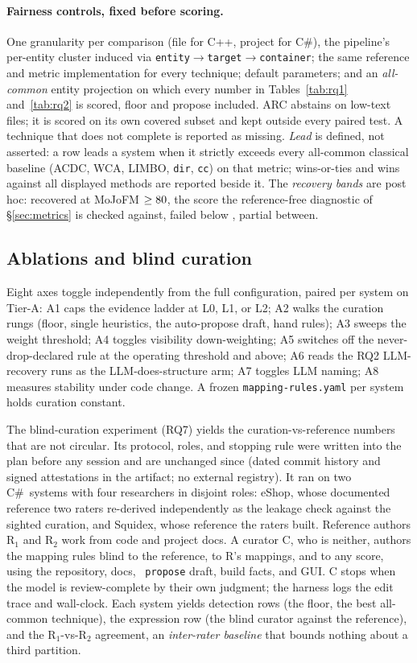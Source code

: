 \paragraph{Fairness controls, fixed before scoring.} One granularity per comparison (file for
C++, project for C\#), the pipeline's per-entity cluster induced via
\texttt{entity}$\to$\texttt{target}$\to$\texttt{container}; the same reference and metric
implementation for every technique; default parameters; and an \emph{all-common} entity
projection on which every number in Tables~\ref{tab:rq1} and~\ref{tab:rq2} is scored, floor and
propose included. ARC abstains on low-text files; it is scored on its own covered subset and kept
outside every paired test. A technique that does not complete is reported as missing. \emph{Lead}
is defined, not asserted: a row leads a system when it strictly exceeds every all-common classical
baseline (ACDC, WCA, LIMBO, \texttt{dir}, \texttt{cc}) on that metric; wins-or-ties and wins
against all displayed methods are reported beside it. The \emph{recovery bands} are post hoc:
recovered at MoJoFM $\ge80{}$, the score the reference-free diagnostic of
\S\ref{sec:metrics} is checked against, failed below \rqTwoFailedBelow{}, partial between.

\subsection{Ablations and blind curation}
\label{sec:ablation}

Eight axes toggle independently from the full configuration, paired per system on Tier-A: A1 caps
the evidence ladder at L0, L1, or L2; A2 walks the curation rungs (floor, single heuristics, the
auto-propose draft, hand rules); A3 sweeps the weight threshold; A4 toggles visibility
down-weighting; A5 switches off the never-drop-declared rule at the operating threshold and above;
A6 reads the RQ2 LLM-recovery runs as the LLM-does-structure arm; A7 toggles LLM naming; A8 measures stability under code
change. A frozen \texttt{mapping-rules.yaml} per system holds curation constant.

The blind-curation experiment (RQ7) yields the curation-vs-reference numbers that are not
circular. Its protocol, roles, and stopping rule were written into the plan before any session
and are unchanged since (dated commit history and signed attestations in the artifact; no external
registry). It ran on two C\#\ systems with four researchers in disjoint roles: eShop, whose
documented reference two raters re-derived independently as the leakage check against the sighted
curation, and Squidex, whose reference the raters built. Reference authors R$_1$ and R$_2$ work
from code and project docs. A curator C, who is neither, authors the mapping rules blind to the
reference, to R's mappings, and to any score, using the repository, docs, \cli~\texttt{propose}
draft, build facts, and GUI. C stops when the model is review-complete by their own judgment;
the harness logs the edit trace and wall-clock. Each system yields detection rows (the floor, the
best all-common technique), the expression row (the blind curator against the reference), and the
R$_1$-vs-R$_2$ agreement, an \emph{inter-rater baseline} that bounds nothing about a third
partition.

